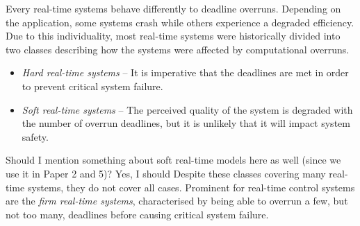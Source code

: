 Every real-time systems behave differently to deadline overruns.
Depending on the application, some systems crash while others experience a degraded efficiency.
Due to this individuality, most real-time systems were historically divided into two classes describing how the systems were affected by computational overruns.
%
\begin{itemize}
    \item \emph{Hard real-time systems} -- It is imperative that the deadlines are met in order to prevent critical system failure.

    \item \emph{Soft real-time systems} -- The perceived quality of the system is degraded with the number of overrun deadlines, but it is unlikely that it will impact system safety.
\end{itemize}
%
\question%
{Should I mention something about soft real-time models here as well (since we use it in Paper 2 and 5)?}%
{Yes, I should}
Despite these classes covering many real-time systems, they do not cover all cases.
Prominent for real-time control systems are the \emph{firm real-time systems}, characterised by being able to overrun a few, but not too many, deadlines before causing critical system failure.

